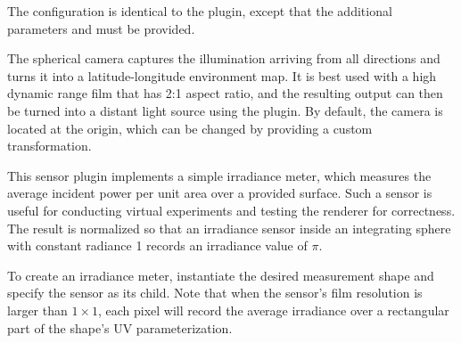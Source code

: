 The configuration is identical to the  plugin, except that
the additional parameters  and  must be provided.


The spherical camera captures the illumination arriving from all
directions and turns it into a latitude-longitude environment map.
It is best used with a high dynamic range film that has 2:1 aspect ratio,
and the resulting output can then be turned into a distant light source
using the  plugin.
By default, the camera is located at the origin, which can
be changed by providing a custom  transformation.

This sensor plugin implements a simple irradiance meter, which
measures the average incident power per unit area over a
provided surface.
Such a sensor is useful for conducting virtual experiments and
testing the renderer for correctness.
The result is normalized so that an irradiance sensor inside an
integrating sphere with constant radiance 1 records
an irradiance value of $\pi$.

To create an irradiance meter, instantiate the desired measurement
shape and specify the sensor as its child. Note that when the
sensor's film resolution is larger than $1\times 1$, each pixel
will record the average irradiance over a rectangular part of the
shape's UV parameterization.

